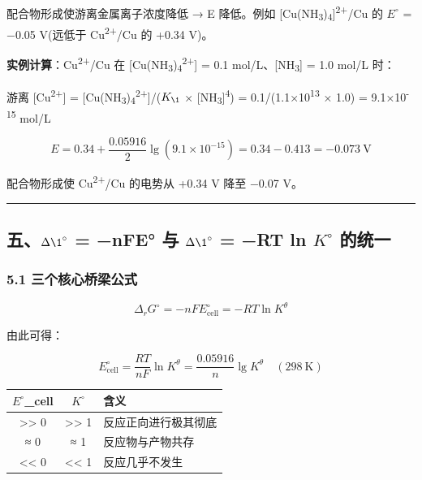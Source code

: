\documentclass[a4paper,11pt]{ctexart}
\newcounter{none}
\begin{document}
配合物形成使游离金属离子浓度降低 → E 降低。例如 {[}Cu(NH\textsubscript{3})\textsubscript{4}{]}\textsuperscript{2+}/Cu 的 \(E^{\circ}\) = −0.05 V(远低于 Cu\textsuperscript{2+}/Cu 的 +0.34 V)。

\textbf{实例计算}：Cu\textsuperscript{2+}/Cu 在 {[}Cu(NH\textsubscript{3})\textsubscript{4}\textsuperscript{2+}{]} = 0.1 mol/L、{[}NH\textsubscript{3}{]} = 1.0 mol/L 时：

游离 {[}Cu\textsuperscript{2+}{]} = {[}Cu(NH\textsubscript{3})\textsubscript{4}\textsuperscript{2+}{]}/(\(K_{\1}\) × {[}NH\textsubscript{3}{]}\textsuperscript{4}) = 0.1/(1.1×10\textsuperscript{13} × 1.0) = 9.1×10\textsuperscript{-15} mol/L

\[E = 0.34 + \frac{0.05916}{2}\lg(9.1\times10^{-15}) = 0.34 - 0.413 = -0.073\ \mathrm{V}\]

配合物形成使 Cu\textsuperscript{2+}/Cu 的电势从 +0.34 V 降至 −0.07 V。

\begin{center}\rule{0.5\linewidth}{0.5pt}\end{center}

\subsection{\texorpdfstring{五、\(\Delta \1^{\circ}\) = −nFE° 与 \(\Delta \1^{\circ}\) = −RT ln \(K^{\circ}\) 的统一}{五、\textbackslash Delta \textbackslash1\^{}\{\textbackslash circ\} = −nFE° 与 \textbackslash Delta \textbackslash1\^{}\{\textbackslash circ\} = −RT ln K\^{}\{\textbackslash circ\} 的统一}}\label{ux4e94delta-1circ-nfe-ux4e0e-delta-1circ-rt-ln-kcirc-ux7684ux7edfux4e00}

\subsubsection{5.1 三个核心桥梁公式}\label{ux4e09ux4e2aux6838ux5fc3ux6865ux6881ux516cux5f0f}

\[
\boxed{\Delta_rG^\circ = -nFE^\circ_{\text{cell}} = -RT\ln K^\theta}
\]

由此可得：

\[
E^\circ_{\text{cell}} = \frac{RT}{nF}\ln K^\theta = \frac{0.05916}{n}\lg K^\theta \quad (298\ \mathrm{K})
\]

{\def\LTcaptype{none} %
\begin{longtable}[]{@{}ccl@{}}
\toprule\noalign{}
\(E^{\circ}\)\_cell & \(K^{\circ}\) & 含义 \\
\midrule\noalign{}
\endhead
\bottomrule\noalign{}
\endlastfoot
\textgreater\textgreater{} 0 & \textgreater\textgreater{} 1 & 反应正向进行极其彻底 \\
≈ 0 & ≈ 1 & 反应物与产物共存 \\
\textless\textless{} 0 & \textless\textless{} 1 & 反应几乎不发生 \\
\end{longtable}
}
\end{document}
